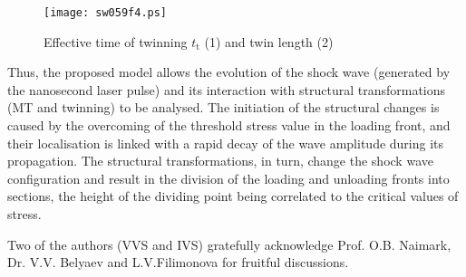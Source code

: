 \documentclass[sw,bibself]{svjour}
\begin{document}
\begin{figure}
\centering\leavevmode\texttt{[image: sw059f4.ps]}
\caption{Effective time of twinning $t_{\mathrm{t}}$ (1) and twin length (2)}
\label{fig4}
\end{figure}

Thus, the proposed model allows the evolution of the shock wave
(generated by the nanosecond laser pulse) and its interaction with
structural transformations (MT and twinning) to be analysed.
The initiation of the structural changes is caused by the overcoming of
the threshold stress value in the loading front, and their localisation
is linked with a rapid decay of the wave amplitude during its propagation.
The structural transformations, in turn, change the shock wave
configuration and result in the division of the loading and
unloading fronts into sections, the height of the dividing point being
correlated to the critical values of stress.

\begin{acknowledgement}
Two of the authors (VVS and IVS) gratefully
acknowledge Prof. O.B. Naimark, Dr. V.V. Belyaev and L.V.Filimonova
for fruitful discussions.
\end{acknowledgement}
\end{document}
